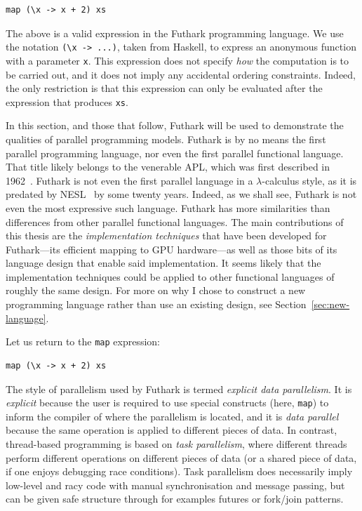 \begin{lstlisting}
map (\x -> x + 2) xs
\end{lstlisting}

The above is a valid expression in the Futhark programming language.
We use the notation \lstinline{(\x -> ...)}, taken from Haskell, to
express an anonymous function with a parameter \lstinline{x}.  This
expression does not specify \textit{how} the computation is to be
carried out, and it does not imply any accidental ordering
constraints.  Indeed, the only restriction is that this expression can
only be evaluated after the expression that produces \lstinline{xs}.

In this section, and those that follow, Futhark will be used to
demonstrate the qualities of parallel programming models.  Futhark is
by no means the first parallel programming language, nor even the
first parallel functional language.  That title likely belongs to the
venerable APL, which was first described in 1962~\cite{iversonbook}.
Futhark is not even the first parallel language in a
$\lambda$-calculus style, as it is predated by
NESL~\cite{BlellochCACM96NESL} by some twenty years.  Indeed, as we
shall see, Futhark is not even the most expressive such language.
Futhark has more similarities than differences from other parallel
functional languages.  The main contributions of this thesis are the
\textit{implementation techniques} that have been developed for
Futhark---its efficient mapping to GPU hardware---as well as those
bits of its language design that enable said implementation.  It seems
likely that the implementation techniques could be applied to other
functional languages of roughly the same design.  For more on why I
chose to construct a new programming language rather than use an
existing design, see Section~\ref{sec:new-language}.

Let us return to the \lstinline{map} expression:

\begin{lstlisting}
map (\x -> x + 2) xs
\end{lstlisting}

The style of parallelism used by Futhark is termed \textit{explicit
  data parallelism}.  It is \textit{explicit} because the user is
required to use special constructs (here, \lstinline{map}) to inform
the compiler of where the parallelism is located, and it is
\textit{data parallel} because the same operation is applied to
different pieces of data.  In contrast, thread-based programming is
based on \textit{task parallelism}, where different threads perform
different operations on different pieces of data (or a shared piece of
data, if one enjoys debugging race conditions).  Task parallelism does
necessarily imply low-level and racy code with manual synchronisation
and message passing, but can be given safe structure through for
examples futures or fork/join patterns.

